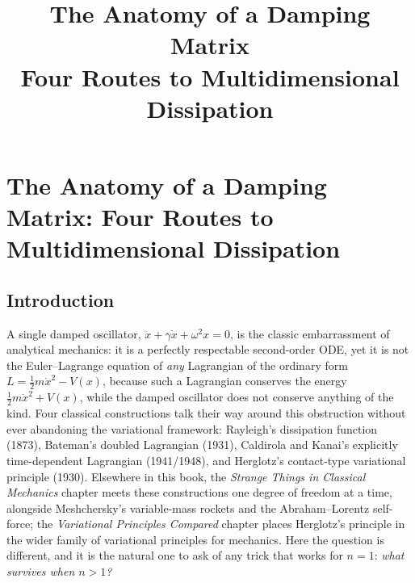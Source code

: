 \documentclass[12pt]{book}
\title{The Anatomy of a Damping Matrix\\[2mm]
\large Four Routes to Multidimensional Dissipation}
\author{}
\date{}
\theoremstyle{definition}
\theoremstyle{remark}
\begin{document}
\pagestyle{plain}

\chapter[The Anatomy of a Damping Matrix]{The Anatomy of a Damping Matrix: Four Routes to Multidimensional Dissipation}
\label{ch:multidim-dissipation}

\tableofcontents

\section*{Introduction}

A single damped oscillator, $\ddot x + \gamma \dot x + \omega^2 x = 0$, is the classic embarrassment of analytical mechanics: it is a perfectly respectable second-order ODE, yet it is not the Euler--Lagrange equation of \emph{any} Lagrangian of the ordinary form $L = \tfrac12 m\dot x^2 - V(x)$, because such a Lagrangian conserves the energy $\tfrac12 m\dot x^2 + V(x)$, while the damped oscillator does not conserve anything of the kind. Four classical constructions talk their way around this obstruction without ever abandoning the variational framework: Rayleigh's dissipation function (1873), Bateman's doubled Lagrangian (1931), Caldirola and Kanai's explicitly time-dependent Lagrangian (1941/1948), and Herglotz's contact-type variational principle (1930). Elsewhere in this book, the \emph{Strange Things in Classical Mechanics} chapter meets these constructions one degree of freedom at a time, alongside Meshchersky's variable-mass rockets and the Abraham--Lorentz self-force; the \emph{Variational Principles Compared} chapter places Herglotz's principle in the wider family of variational principles for mechanics. Here the question is different, and it is the natural one to ask of any trick that works for $n=1$: \emph{what survives when $n>1$?}
\end{document}
